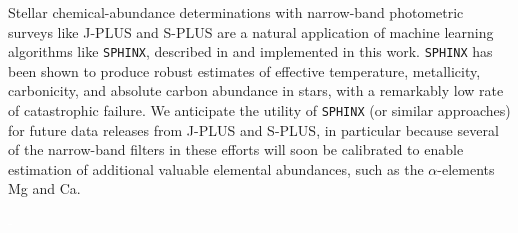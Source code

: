 \documentclass[twocolumn,trackchanges]{aastex63}
\begin{document}
Stellar chemical-abundance determinations with narrow-band photometric surveys like J-PLUS and S-PLUS are a natural application of machine learning algorithms like \texttt{SPHINX}, described in \citet{Whitten:2019a} and implemented in this work. \texttt{SPHINX} has been shown to produce robust estimates of effective temperature, metallicity, carbonicity, and absolute carbon abundance in stars, with a remarkably low rate of catastrophic failure. We anticipate the utility of \texttt{SPHINX} (or similar approaches) for future data releases from J-PLUS and S-PLUS, in particular because several of the narrow-band filters in these efforts will soon be calibrated to enable estimation of additional valuable elemental abundances, such as the $\alpha$-elements Mg and Ca.

\acknowledgments

\textcolor{white}{-}
\end{document}
